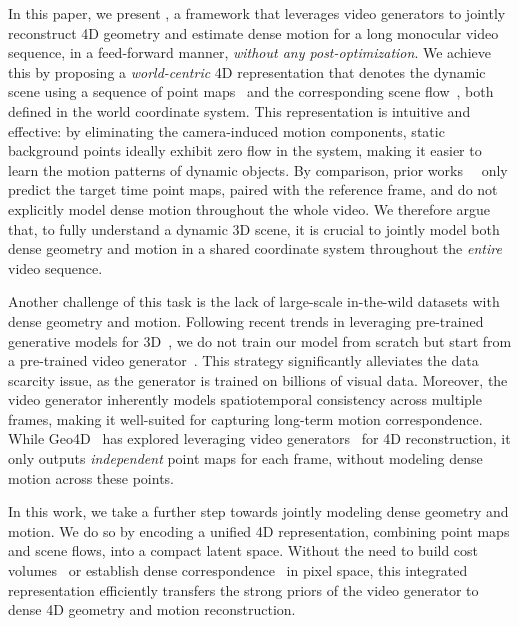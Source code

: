 In this paper,
we present \method,
a framework that leverages video generators to jointly reconstruct 4D geometry and estimate dense motion
for a long monocular video sequence,
in a feed-forward manner,
\emph{without any post-optimization}.
We achieve this by proposing a \emph{world-centric} 4D representation
that denotes the dynamic scene using a sequence of point maps~\cite{wang2024dust3r,wang2025vggt,jiang2025geo4d}
and the corresponding scene flow~\cite{horn1981determining}, both defined in the world coordinate system.
This representation is intuitive and effective:
by eliminating the camera-induced motion components,
static background points ideally exhibit zero flow in the system,
making it easier to learn the motion patterns of dynamic objects.
By comparison,
prior works~~\cite{st4rtrack2025,sucar2025dynamic,jin2024stereo4d} only predict the target time point maps,
paired with the reference frame,
and do not explicitly model dense motion throughout the whole video.
We therefore argue that, to fully understand a dynamic 3D scene, it is crucial to jointly model both dense geometry and motion in a shared coordinate system throughout the \emph{entire} video sequence.


Another challenge of this task is the lack of large-scale in-the-wild datasets with dense geometry and motion.
Following recent trends in leveraging pre-trained generative models for 3D~\cite{ke2024repurposing,lu2025matrix3d,jiang2025geo4d}, we do not train our model from scratch but start from a pre-trained video generator~\cite{blattmann2023stable}.
This strategy significantly alleviates the data scarcity issue,
as the generator is trained on billions of visual data.
Moreover, the video generator inherently models spatiotemporal consistency across multiple frames,
making it well-suited for capturing long-term motion correspondence.
While Geo4D~\cite{jiang2025geo4d} has explored leveraging video generators~\cite{blattmann2023stable,xu2025geometrycrafter} for 4D reconstruction,
it only outputs \emph{independent} point maps for each frame,
without modeling dense motion across these points.

In this work, we take a further step towards jointly modeling dense geometry and motion.
We do so by encoding a unified 4D representation, combining point maps and scene flows, into a compact latent space.
Without the need to build cost volumes~\cite{teed2021raft} or establish dense correspondence~\cite{sucar2025dynamic} in pixel space, this integrated representation efficiently transfers the strong priors of the video generator to dense 4D geometry and motion reconstruction.


